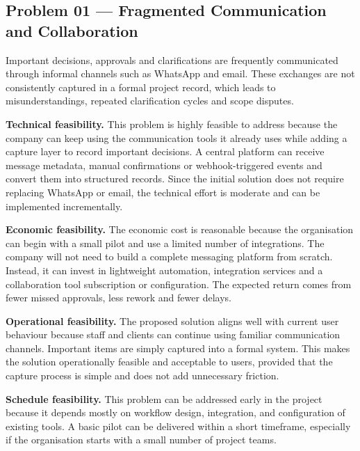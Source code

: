 \documentclass[12pt,a4paper]{report}
\begin{document}
\subsection{Problem 01 --- Fragmented Communication and Collaboration}

\begin{problemBox}
Important decisions, approvals and clarifications are frequently communicated through informal channels such as WhatsApp and email. These exchanges are not consistently captured in a formal project record, which leads to misunderstandings, repeated clarification cycles and scope disputes.
\end{problemBox}

\textbf{Technical feasibility.} This problem is highly feasible to address because the company can keep using the communication tools it already uses while adding a capture layer to record important decisions. A central platform can receive message metadata, manual confirmations or webhook-triggered events and convert them into structured records. Since the initial solution does not require replacing WhatsApp or email, the technical effort is moderate and can be implemented incrementally.

\textbf{Economic feasibility.} The economic cost is reasonable because the organisation can begin with a small pilot and use a limited number of integrations. The company will not need to build a complete messaging platform from scratch. Instead, it can invest in lightweight automation, integration services and a collaboration tool subscription or configuration. The expected return comes from fewer missed approvals, less rework and fewer delays.

\textbf{Operational feasibility.} The proposed solution aligns well with current user behaviour because staff and clients can continue using familiar communication channels. Important items are simply captured into a formal system. This makes the solution operationally feasible and acceptable to users, provided that the capture process is simple and does not add unnecessary friction.

\textbf{Schedule feasibility.} This problem can be addressed early in the project because it depends mostly on workflow design, integration, and configuration of existing tools. A basic pilot can be delivered within a short timeframe, especially if the organisation starts with a small number of project teams.
\end{document}
